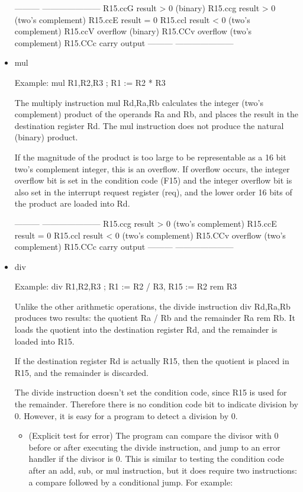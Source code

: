 \documentclass[11pt]{article}
\begin{document}
\begin{itemize}
---------  ---------------------
 R15.ccG    result > 0 (binary)
 R15.ccg    result > 0 (two's complement)
 R15.ccE    result = 0
 R15.ccl    result < 0 (two's complement)
 R15.ccV    overflow (binary)
 R15.CCv    overflow (two's complement)
 R15.CCc    carry output
---------  ---------------------

\item mul
\label{sec:orgf170d94}

Example: mul R1,R2,R3 ; R1 := R2 * R3

The multiply instruction mul Rd,Ra,Rb calculates the integer (two's
complement) product of the operands Ra and Rb, and places the result
in the destination register Rd.  The mul instruction does not produce
the natural (binary) product.

If the magnitude of the product is too large to be representable as a
16 bit two's complement integer, this is an overflow.  If overflow
occurs, the integer overflow bit is set in the condition code (F15)
and the integer overflow bit is also set in the interrupt request
register (req), and the lower order 16 bits of the product are loaded
into Rd.

---------  ---------------------
 R15.ccg    result > 0 (two's complement)
 R15.ccE    result = 0
 R15.ccl    result < 0 (two's complement)
 R15.CCv    overflow (two's complement)
 R15.CCc    carry output
---------  ---------------------

\item div
\label{sec:org8a4f32e}

Example: div R1,R2,R3 ; R1 := R2 / R3, R15 := R2 rem R3

Unlike the other arithmetic operations, the divide instruction div
Rd,Ra,Rb produces two results: the quotient Ra / Rb and the remainder
Ra rem Rb.  It loads the quotient into the destination register Rd,
and the remainder is loaded into R15.

If the destination register Rd is actually R15, then the quotient is
placed in R15, and the remainder is discarded.

The divide instruction doesn't set the condition code, since R15 is
used for the remainder.  Therefore there is no condition code bit to
indicate division by 0.  However, it is easy for a program to detect a
division by 0.

\begin{itemize}
\item (Explicit test for error) The program can compare the divisor with 0
before or after executing the divide instruction, and jump to an
error handler if the divisor is 0.  This is similar to testing the
condition code after an add, sub, or mul instruction, but it does
require two instructions: a compare followed by a conditional jump.
For example:
\end{itemize}


\end{itemize}
\end{document}
